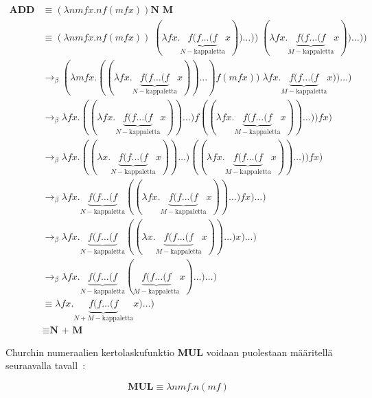 \begin{align*} \textbf{ADD N M} &\equiv (\lambda nmfx . n f (m f x)) \textbf{N M} \\ 
&\equiv  (\lambda nmfx . n f (m f x)) \; (\lambda fx . \underbrace{ f ( f \ldots (f }_{ N-\text{kappaletta}} x)) \ldots )) \; (\lambda fx . \underbrace{ f ( f \ldots (f }_{ M-\text{kappaletta}} x)) \ldots ))\\ 
&\rightarrow_{\beta} (\lambda mfx . ((\lambda fx . \underbrace{ f ( f \ldots (f }_{ N-\text{kappaletta}} x)) \ldots ) f (m f x)) \; \lambda fx . \underbrace{ f ( f \ldots (f }_{ M-\text{kappaletta}} x)) \ldots )\\ 
&\rightarrow_{\beta} \lambda fx . ((\lambda fx . \underbrace{ f ( f \ldots (f }_{ N-\text{kappaletta}} x)) \ldots ) f ( (\lambda fx . \underbrace{ f ( f \ldots (f }_{ M-\text{kappaletta}} x)) \ldots )) f x ) \\
&\rightarrow_{\beta} \lambda fx . ((\lambda x . \underbrace{ f ( f \ldots (f }_{ N-\text{kappaletta}} x)) \ldots ) ( (\lambda fx . \underbrace{ f ( f \ldots (f }_{ M-\text{kappaletta}} x)) \ldots )) f x ) \\
&\rightarrow_{\beta}  \lambda fx . \underbrace{ f ( f \ldots (f }_{ N-\text{kappaletta}} ( (\lambda fx . \underbrace{ f ( f \ldots (f }_{ M-\text{kappaletta}} x)) \ldots ) f x ) \ldots )\\
&\rightarrow_{\beta}  \lambda fx . \underbrace{ f ( f \ldots (f }_{ N-\text{kappaletta}} ( (\lambda x . \underbrace{ f ( f \ldots (f }_{ M-\text{kappaletta}} x)) \ldots )  x ) \ldots) \\
&\rightarrow_{\beta}  \lambda fx . \underbrace{ f ( f \ldots (f }_{ N-\text{kappaletta}} (\underbrace{ f ( f \ldots (f }_{ M-\text{kappaletta}} x) \ldots ) \ldots ) \\
&\equiv \lambda fx . \underbrace{ f ( f \ldots (f }_{ N + M-\text{kappaletta}} x) \ldots ) \\
&\equiv \textbf{N + M}  
\end{align*}

Churchin numeraalien kertolaskufunktio \textbf{MUL} voidaan puolestaan määritellä seuraavalla tavall~\cite[s.~20]{Sel2013}:

\[ \textbf{MUL} \equiv \lambda n m f . n (mf) \]

